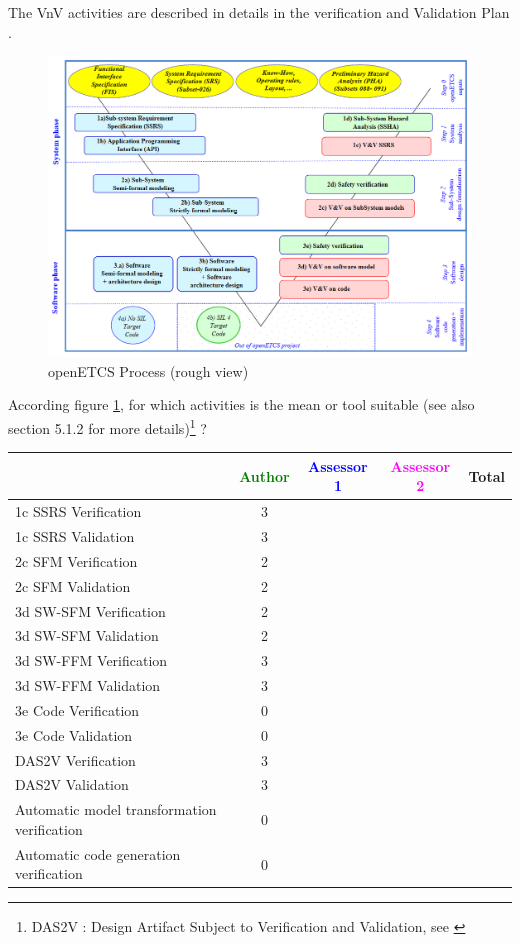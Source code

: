 The VnV activities are described in details in the verification and Validation Plan  \citep{D4.1}.

\begin{figure}[htb]
  \centering
  \includegraphics[width=.9\textwidth]{images/ProcessOpenETCS-BeM.png}
  \caption{openETCS Process (rough view)}
  \label{fig:openETCSProcess}
\end{figure}

According figure \ref{fig:openETCSProcess}, for which activities is the mean or tool suitable (see also \citep{D4.1} section 5.1.2 for more details)\footnote{DAS2V : Design Artifact Subject to Verification and Validation, see \citep{D4.1}} ?


\begin{tabular}{|l | c | c | c | c|}
\hline
& \textcolor{green}{Author} & \textcolor{blue}{Assessor 1} & \textcolor{magenta}{Assessor 2} & Total \\
\hline 
1c SSRS Verification & 3 & & &  \\
\hline
1c SSRS Validation & 3 & & &  \\
\hline
2c SFM Verification & 2 & & &  \\
\hline
2c SFM Validation & 2 & & &  \\
\hline
3d SW-SFM Verification & 2 & & &  \\
\hline
3d SW-SFM Validation & 2 & & &  \\
\hline
3d SW-FFM Verification & 3 & & &  \\
\hline
3d SW-FFM Validation & 3 & & &  \\
\hline
3e Code Verification & 0 & & &  \\
\hline
3e Code Validation & 0 & & &  \\
\hline
DAS2V Verification & 3 & & &  \\
\hline
DAS2V Validation & 3 & & &  \\
\hline
Automatic model transformation verification & 0 & & &  \\
\hline
Automatic code generation verification & 0 & & &  \\
\hline
\end{tabular}

